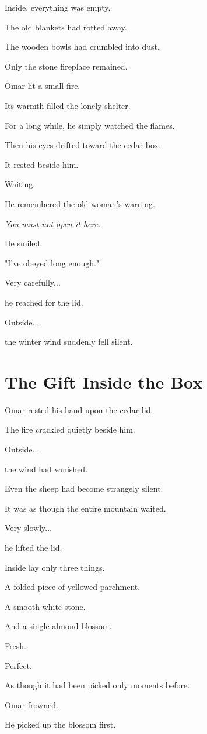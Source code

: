 \documentclass[12pt,openany]{book}
\begin{document}
Inside, everything was empty.

The old blankets had rotted away.

The wooden bowls had crumbled into dust.

Only the stone fireplace remained.

Omar lit a small fire.

Its warmth filled the lonely shelter.

For a long while, he simply watched the flames.

Then his eyes drifted toward the cedar box.

It rested beside him.

Waiting.

He remembered the old woman's warning.

\emph{You must not open it here.}

He smiled.

"I've obeyed long enough."

Very carefully...

he reached for the lid.

Outside...

the winter wind suddenly fell silent.
\section*{The Gift Inside the Box}

Omar rested his hand upon the cedar lid.

The fire crackled quietly beside him.

Outside...

the wind had vanished.

Even the sheep had become strangely silent.

It was as though the entire mountain waited.

Very slowly...

he lifted the lid.

Inside lay only three things.

A folded piece of yellowed parchment.

A smooth white stone.

And a single almond blossom.

Fresh.

Perfect.

As though it had been picked only moments before.

Omar frowned.

He picked up the blossom first.
\end{document}
